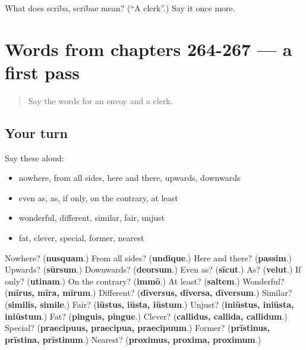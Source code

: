 \begin{tcolorbox}[breakable,colback=teal!4,colframe=teal!35!black,title={Before you move on}]
What does scrība, scrībae mean? (\textquotedblleft{}A clerk\textquotedblright{}.) Say it once more.
\end{tcolorbox}
\section[(dialogue)]{Words from chapters 264-267 — a first pass}

\label{lesson:LA-R272-first-pass-words-from-chapters-264-267}



\begin{quote}
Say the words for an envoy and a clerk.
\end{quote}

\subsection*{Your turn}
Say these aloud:

\begin{itemize}
\raggedright
  \item nowhere, from all sides, here and there, upwards, downwards
  \item even as, as, if only, on the contrary, at least
  \item wonderful, different, similar, fair, unjust
  \item fat, clever, special, former, nearest
\end{itemize}

\begin{tcolorbox}[breakable,colback=teal!4,colframe=teal!35!black,title={Before you move on}]
Nowhere? (\textbf{nusquam}.) From all sides? (\textbf{undique}.) Here and there? (\textbf{passim}.) Upwards? (\textbf{sūrsum}.) Downwards? (\textbf{deorsum}.) Even as? (\textbf{sīcut}.) As? (\textbf{velut}.) If only? (\textbf{utinam}.) On the contrary? (\textbf{immō}.) At least? (\textbf{saltem}.) Wonderful? (\textbf{mīrus, mīra, mīrum}.) Different? (\textbf{dīversus, dīversa, dīversum}.) Similar? (\textbf{similis, simile}.) Fair? (\textbf{iūstus, iūsta, iūstum}.) Unjust? (\textbf{iniūstus, iniūsta, iniūstum}.) Fat? (\textbf{pinguis, pingue}.) Clever? (\textbf{callidus, callida, callidum}.) Special? (\textbf{praecipuus, praecipua, praecipuum}.) Former? (\textbf{prīstinus, prīstina, prīstinum}.) Nearest? (\textbf{proximus, proxima, proximum}.)
\end{tcolorbox}
